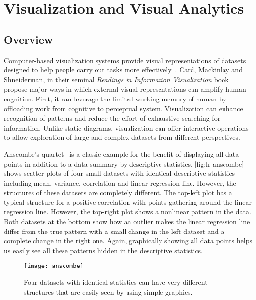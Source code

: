 \section{Visualization and Visual Analytics}

\subsection{Overview}
Computer-based visualization systems provide visual representations of datasets designed to help people carry out tasks more effectively~\cite{Munzner2014}. Card, Mackinlay and Shneiderman, in their seminal \emph{Readings in Information Visualization} book~\cite{Card1999} propose major ways in which external visual representations can amplify human cognition. First, it can leverage the limited working memory of human by offloading work from cognitive to perceptual system. Visualization can enhance recognition of patterns and reduce the effort of exhaustive searching for information. Unlike static diagrams, visualization can offer interactive operations to allow exploration of large and complex datasets from different perspectives.

Anscombe's quartet~\cite{Anscombe1973} is a classic example for the benefit of displaying all data points in addition to a data summary by descriptive statistics. \autoref{fig:lr-anscombe} shows scatter plots of four small datasets with identical descriptive statistics including mean, variance, correlation and linear regression line. However, the structures of these datasets are completely different. The top-left plot has a typical structure for a positive correlation with points gathering around the linear regression line. However, the top-right plot shows a nonlinear pattern in the data. Both datasets at the bottom show how an outlier makes the linear regression line differ from the true pattern with a small change in the left dataset and a complete change in the right one. Again, graphically showing all data points helps us easily see all these patterns hidden in the descriptive statistics.

\begin{figure}
	\centering
	\texttt{[image: anscombe]}
	\caption[An example showing benefit of visualization]{Four datasets with identical statistics can have very different structures that are easily seen by using simple graphics. }
	\label{fig:lr-anscombe}
\end{figure}

